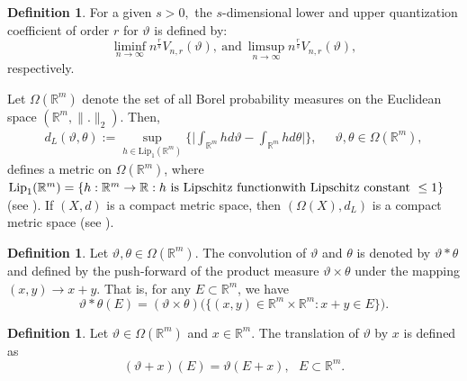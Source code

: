 \documentclass{amsproc}
\theoremstyle{definition}
\newtheorem{definition}[theorem]{Definition}
\theoremstyle{remark}
\numberwithin{equation}{section}
\newcommand{\set}[1]{\{#1\}}%
\newcommand{\C}[1]{\mathcal{#1}}%
\newcommand{\D}[1]{\mathbb{#1}}%
\newcommand{\te}{\text}%
\begin{document}
\begin{definition}\cite{GL1}
    For a given $s>0,$ the $s$-dimensional lower and upper quantization coefficient of order $r$ for $\vartheta$ is defined by:
    $$\liminf_{n \to \infty} n^{\frac{r}{s}}V_{n,r}(\vartheta),~ \text{and}~ \limsup_{n \to \infty}  n^{\frac{r}{s}}V_{n,r}(\vartheta),$$
    respectively.
\end{definition}
Let $\Omega(\mathbb{R}^m)$ denote the set of all Borel probability measures on the Euclidean space $(\mathbb{R}^m,\|.\|_2)$. Then,
\begin{equation*}
\begin{aligned}
d_L (\vartheta, \theta) :=\sup_{h\in\te{Lip}_1(\mathbb{R}^m)} \Big\{\Big|\int_{\mathbb{R}^m} h d\vartheta -\int_{\mathbb{R}^m} hd\theta\Big|\Big\}, \ \ \quad \vartheta, \theta \in \Omega(\mathbb{R}^m) , \end{aligned}
\end{equation*}
defines a metric on $\Omega(\mathbb{R}^m)$, where $\te{Lip}_1(\mathbb{R}^m)=\{h:\mathbb{R}^m\rightarrow \mathbb{R}: h\te{ is Lipschitz function}\\ \te{with Lipschitz constant }\le1\}$ (see \cite{Mat,Parth}). If $(X,d)$ is a compact metric space, then
$(\Omega(X), d_L)$ is a compact metric space (see \cite[Theorem~5.1]{B}).
\par






\begin{definition}
Let $\vartheta, \theta \in \Omega(\mathbb{R}^m).$ The convolution of $\vartheta$ and $\theta$ is denoted by $\vartheta *\theta$ and defined by the push-forward of the product measure $\vartheta \times \theta$ under the mapping $(x,y)\to x+y.$ That is, for any $E \subset \mathbb{R}^m$, we have $$\vartheta * \theta (E)= (\vartheta \times \theta )\big(\{(x,y) \in \mathbb{R}^m\times \mathbb{R}^m: x+y \in E\}\big).$$
\end{definition}
\begin{definition}
Let $\vartheta \in \Omega(\mathbb{R}^m)$ and $x \in \mathbb{R}^m.$ The translation of $\vartheta$ by $x$ is defined as 
\[
(\vartheta+x)(E)=\vartheta(E+x),~~~E \subset \mathbb{R}^m.
\]
\end{definition}
\end{document}
